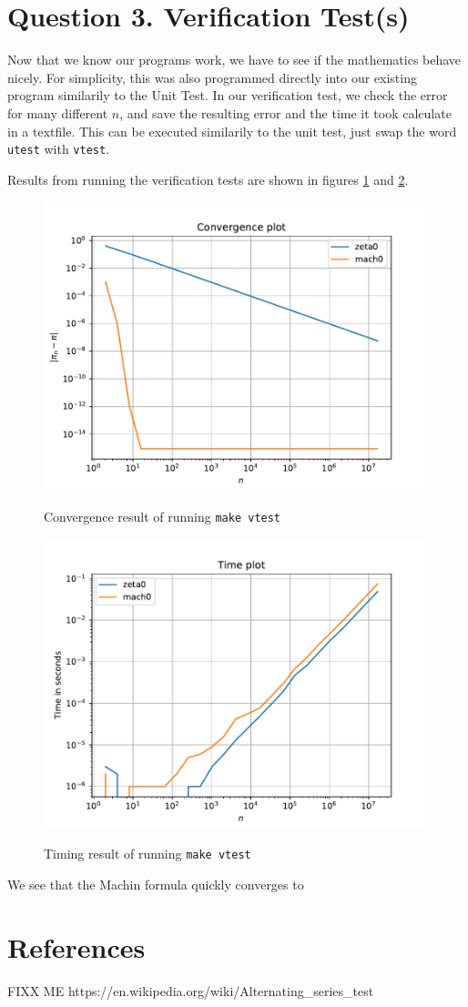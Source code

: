 \documentclass[12pt]{article}
\begin{document}
\section{Question 3. Verification Test(s)}
Now that we know our programs work, we have to see if the mathematics behave nicely. For simplicity, this was also programmed directly into our existing program similarily to the Unit Test.
In our verification test, we check the error for many different $n$, and save the resulting error and the time it took calculate in a textfile. This can be executed similarily
to the unit test, just swap the word \texttt{utest} with \texttt{vtest}.

Results from running the verification tests are shown in figures \ref{fig:Convergence1} and \ref{fig:Time1}. 

\begin{figure}[!htb]
    \centering
    \caption{Convergence result of running \texttt{make vtest}}
    \includegraphics[width=\textwidth]{Convergence1}
    \label{fig:Convergence1}
\end{figure}

\begin{figure}[!htb]
    \centering
    \caption{Timing result of running \texttt{make vtest}}
    \includegraphics[width=\textwidth]{Time1}
    \label{fig:Time1}
\end{figure}
We see that the Machin formula quickly converges to 

\section{References}
FIXX ME
https://en.wikipedia.org/wiki/Alternating\_series\_test
\end{document}
